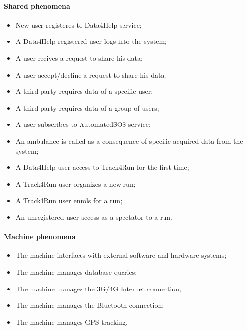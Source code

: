 \paragraph{Shared phenomena}
\begin{itemize}
  \item New user registeres to Data4Help service;
  \item A Data4Help registered user logs into the system;
  \item A user recives a request to share his data;
  \item A user accept/decline a request to share his data;
  \item A third party requires data of a specific user;
  \item A third party requires data of a group of users;
  \item A user subscribes to AutomatedSOS service;
  \item An ambulance is called as a consequence of specific acquired data from the system;
  \item A Data4Help user access to Track4Run for the first time;
  \item A Track4Run user organizes a new run;
  \item A Track4Run user enrols for a run;
  \item An unregistered user access as a spectator to a run.
\end{itemize}
\paragraph{Machine phenomena}
\begin{itemize}
  \item The machine interfaces with external software and hardware systems;
  \item The machine manages database queries;
  \item The machine manages the 3G/4G Internet connection;
  \item The machine manages the Bluetooth connection;
  \item The machine manages GPS tracking.
\end{itemize}

